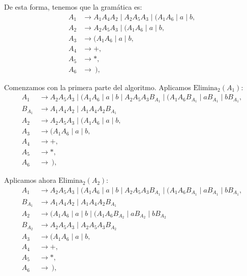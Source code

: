 \documentclass[12pt]{article}
\begin{document}
\begin{ejercicio}[2.5 puntos]
\begin{description}
        De esta forma, tenemos que la gramática es:
        \begin{align*}
            A_1 &\to A_1 A_4 A_2 \mid A_2 A_5 A_3 \mid (A_1 A_6 \mid a \mid b, \\
            A_2 &\to A_2 A_5 A_3 \mid (A_1 A_6 \mid a \mid b, \\
            A_3 &\to (A_1 A_6 \mid a \mid b,\\
            A_4 &\to +,\\
            A_5 &\to *,\\
            A_6 &\to~),
        \end{align*}

        Comenzamos con la primera parte del algoritmo. Aplicamos $\text{Elimina}_2(A_1)$:
        \begin{align*}
            A_1 &\to A_2 A_5 A_3 \mid (A_1 A_6 \mid a \mid b\mid A_2 A_5 A_3 B_{A_1} \mid (A_1 A_6 B_{A_1} \mid a B_{A_1} \mid b B_{A_1}, \\
            B_{A_1} &\to A_1 A_4 A_2 \mid A_1 A_4 A_2 B_{A_1} \\
            A_2 &\to A_2 A_5 A_3 \mid (A_1 A_6 \mid a \mid b, \\
            A_3 &\to (A_1 A_6 \mid a \mid b,\\
            A_4 &\to +,\\
            A_5 &\to *,\\
            A_6 &\to~),
        \end{align*}

        Aplicamos ahora $\text{Elimina}_2(A_2)$:
        \begin{align*}
            A_1 &\to A_2 A_5 A_3 \mid (A_1 A_6 \mid a \mid b\mid A_2 A_5 A_3 B_{A_1} \mid (A_1 A_6 B_{A_1} \mid a B_{A_1} \mid b B_{A_1}, \\
            B_{A_1} &\to A_1 A_4 A_2 \mid A_1 A_4 A_2 B_{A_1} \\
            A_2 &\to (A_1 A_6 \mid a \mid b \mid (A_1 A_6 B_{A_2} \mid  a B_{A_2} \mid  b B_{A_2} \\
            B_{A_2} & \to A_2 A_5 A_3 \mid A_2 A_5 A_3 B_{A_2}\\
            A_3 &\to (A_1 A_6 \mid a \mid b,\\
            A_4 &\to +,\\
            A_5 &\to *,\\
            A_6 &\to~),
        \end{align*}


\end{description}
\end{ejercicio}
\end{document}
